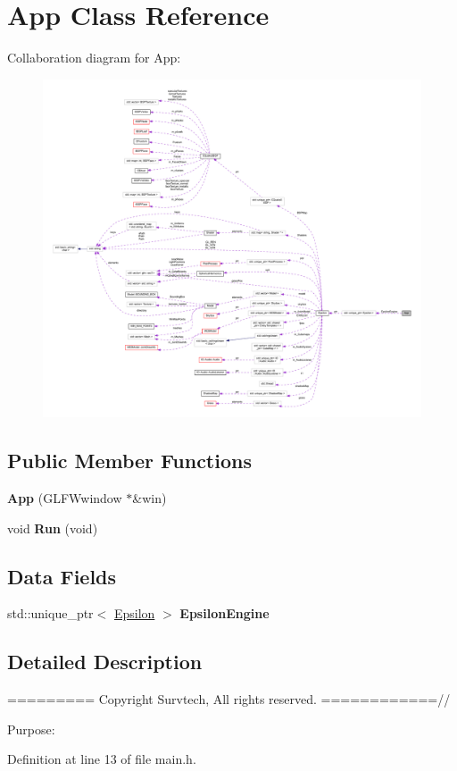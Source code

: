 \hypertarget{class_app}{}\section{App Class Reference}
\label{class_app}


Collaboration diagram for App\+:
\nopagebreak
\begin{figure}[H]
\begin{center}
\leavevmode
\includegraphics[width=350pt]{class_app__coll__graph}
\end{center}
\end{figure}
\subsection*{Public Member Functions}
\begin{DoxyCompactItemize}
\item 
{\bfseries App} (G\+L\+F\+Wwindow $\ast$\&win)\hypertarget{class_app_a4e1aff51a838dd4249f9a222cb01453e}{}\label{class_app_a4e1aff51a838dd4249f9a222cb01453e}

\item 
void {\bfseries Run} (void)\hypertarget{class_app_a48d0843a8f5eb7be1fd589df838d5b56}{}\label{class_app_a48d0843a8f5eb7be1fd589df838d5b56}

\end{DoxyCompactItemize}
\subsection*{Data Fields}
\begin{DoxyCompactItemize}
\item 
std\+::unique\+\_\+ptr$<$ \hyperlink{class_epsilon}{Epsilon} $>$ {\bfseries Epsilon\+Engine}\hypertarget{class_app_a13d267e75cc370f7a495d0140756f2ae}{}\label{class_app_a13d267e75cc370f7a495d0140756f2ae}

\end{DoxyCompactItemize}


\subsection{Detailed Description}
========= Copyright Survtech, All rights reserved. ============//

Purpose\+: 

 

Definition at line 13 of file main.\+h.

